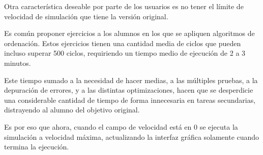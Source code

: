 Otra característica deseable por parte de los usuarios es no tener el 
límite de velocidad de simulación que tiene la versión original.

\bigskip
Es común proponer ejercicios a los alumnos en los que se apliquen algoritmos de ordenación. Estos 
ejercicios tienen una cantidad media de ciclos que pueden incluso superar 500 ciclos, requiriendo
 un tiempo medio de ejecución de 2 a 3 minutos.

\bigskip
Este tiempo sumado a la necesidad de hacer medias,  a las múltiples pruebas, a la depuración de errores,
y a las distintas optimizaciones, hacen que se desperdicie una considerable cantidad de 
tiempo de forma innecesaria en tareas secundarias, distrayendo al alumno del objetivo original.

\bigskip
Es por eso que ahora, cuando el campo de velocidad está en 0 se ejecuta la simulación a velocidad 
máxima, actualizando la interfaz gráfica solamente cuando termina la ejecución. 
